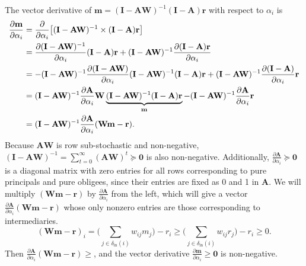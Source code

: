 \documentclass[mnsc,nonblindrev]{informs3}
\newcommand{\din}{\delta_{\text{in}}}
\newcommand{\rvec}{\mathbf{r}}
\newcommand{\A}{\mathbf{A}}
\newcommand{\W}{\mathbf{W}}
\newcommand{\I}{\mathbf{I}}
\newcommand{\mean}{m}
\newcommand{\meanvec}{\mathbf{\mean}}
\let\originalleft\left
\let\originalright\right
\renewcommand{\left}{\mathopen{}\mathclose\bgroup\originalleft}
\renewcommand{\right}{\aftergroup\egroup\originalright}
\renewenvironment{proof}[1][Proof]{%
  \par\noindent{\itshape #1.} \ignorespaces
}{%
  \hfill\Halmos\par
}
\begin{document}
\begin{APPENDICES}
\begin{proof} %
    The vector derivative of $\meanvec = (\I-\A\W)^{-1}(\I-\A)\rvec$ with respect to $\alpha_i$ is
    \begin{align*}
        \frac{\partial \meanvec}{\partial \alpha_i}
        &= \frac{\partial}{\partial \alpha_i} \left[(\I-\A\W)^{-1}\times(\I-\A)\rvec\right] \\
        &= \frac{\partial (\I-\A\W)^{-1}}{\partial \alpha_i}(\I-\A)\rvec + (\I-\A\W)^{-1} \frac{\partial (\I-\A)\rvec}{\partial \alpha_i} \\
        &= -(\I-\A\W)^{-1}\frac{\partial (\I-\A\W)}{\partial \alpha_i}(\I-\A\W)^{-1}(\I-\A)\rvec + (\I-\A\W)^{-1} \frac{\partial (\I-\A)}{\partial \alpha_i}\rvec \\
        &= (\I-\A\W)^{-1}\frac{\partial \A}{\partial \alpha_i} \W \underbrace{(\I-\A\W)^{-1}(\I-\A)\rvec}_{\meanvec} - (\I-\A\W)^{-1} \frac{\partial \A}{\partial \alpha_i}\rvec \\
        &= (\I-\A\W)^{-1}\frac{\partial \A}{\partial \alpha_i}(\W\meanvec-\rvec).
    \end{align*}
    Because $\A\W$ is row sub-stochastic and non-negative, $(\I-\A\W)^{-1} = \sum_{t=0}^\infty (\A\W)^t \succeq \mathbf{0}$ is also non-negative.
    Additionally, $\frac{\partial \A}{\partial \alpha_i}\succeq\mathbf{0}$ is a diagonal matrix with zero entries for all rows corresponding to pure principals and pure obligees, since their entries are fixed as 0 and 1 in $\A$.
    We will multiply $(\W\meanvec-\rvec)$ by $\frac{\partial \A}{\partial \alpha_i}$ from the left, which will give a vector $\frac{\partial \A}{\partial \alpha_i} (\W\meanvec-\rvec)$ whose only nonzero entries are those corresponding to intermediaries.
    \[
        (\W\meanvec-\rvec)_i
        = \Big( \sum_{j\in\din(i)} w_{ij} \mean_j \Big) - r_i
        \geq \Big( \sum_{j\in\din(i)} w_{ij}r_j \Big) - r_i
        \geq 0.
    \]
    Then $\frac{\partial \A}{\partial \alpha_i} (\W\meanvec-\rvec)\geq$, and the vector derivative $\frac{\partial \meanvec}{\partial \alpha_i}\geq\mathbf{0}$ is non-negative.
\end{proof}





\end{APPENDICES}
\end{document}
